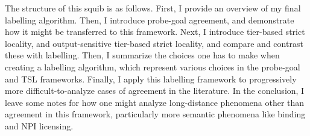 
The structure of this squib is as follows. First, I provide an overview of my final labelling algorithm. Then, I introduce probe-goal agreement, and demonstrate how it might be transferred to this framework. Next, I introduce tier-based strict locality, and output-sensitive tier-based strict locality, and compare and contrast these with labelling. Then, I summarize the choices one has to make when creating a labelling algorithm, which represent various choices in the probe-goal and TSL frameworks. Finally, I apply this labelling framework to progressively more difficult-to-analyze cases of agreement in the literature. In the conclusion, I leave some notes for how one might analyze long-distance phenomena other than agreement in this framework, particularly more semantic phenomena like binding and NPI licensing.
